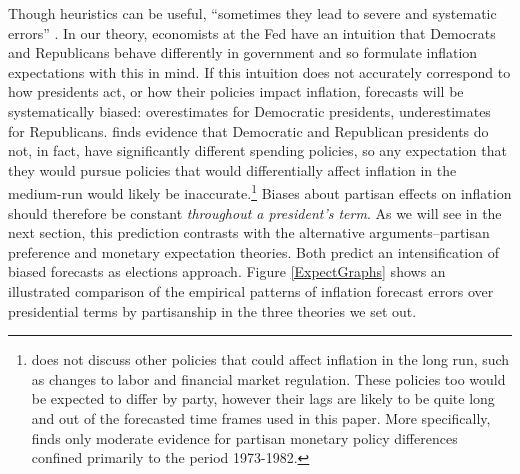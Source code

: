 \documentclass[a4paper]{article}
\begin{document}
Though heuristics can be useful, ``sometimes they lead to severe and systematic errors'' \citep[][1124]{tverskykahneman1974}. In our theory, economists at the Fed have an intuition that Democrats and Republicans behave differently in government and so formulate inflation expectations with this in mind. If this intuition does not accurately correspond to how presidents act, or how their policies impact inflation, forecasts will be systematically biased: overestimates for Democratic presidents, underestimates for Republicans. \cite{Bartels2008} finds evidence that Democratic and Republican presidents do not, in fact, have significantly different spending policies, so any expectation that they would pursue policies that would differentially affect inflation in the medium-run would likely be inaccurate.\footnote{\cite{Bartels2008} does not discuss other policies that could affect inflation in the long run, such as changes to labor and financial market regulation. These policies too would be expected to differ by party, however their lags are likely to be quite long and out of the forecasted time frames used in this paper. More specifically, \cite{Franzese2002} finds only moderate evidence for partisan monetary policy differences confined primarily to the period 1973-1982.} Biases about partisan effects on inflation should therefore be constant {\emph{throughout a president's term}}. As we will see in the next section, this prediction contrasts with the alternative arguments--partisan preference and monetary expectation theories. Both predict an intensification of biased forecasts as elections approach. Figure \ref{ExpectGraphs} shows an illustrated comparison of the empirical patterns of inflation forecast errors over presidential terms by partisanship in the three theories we set out.
\end{document}

